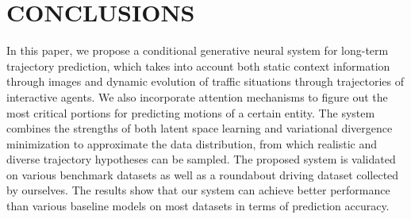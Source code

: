 \documentclass[letterpaper, 10 pt, conference]{ieeeconf}
\begin{document}
\section{CONCLUSIONS}
In this paper, we propose a conditional generative neural system for long-term trajectory prediction, which takes into account both static context information through images and dynamic evolution of traffic situations through trajectories of interactive agents. We also incorporate attention mechanisms to figure out the most critical portions for predicting motions of a certain entity. The system combines the strengths of both latent space learning and variational divergence minimization to approximate the data distribution, from which realistic and diverse trajectory hypotheses can be sampled. The proposed system is validated on various benchmark datasets as well as a roundabout driving dataset collected by ourselves. The results show that our system can achieve better performance than various baseline models on most datasets in terms of prediction accuracy.










\end{document}
